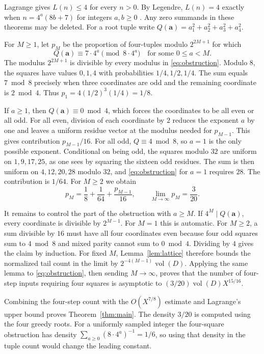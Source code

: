 \documentclass[11pt]{article}
\begin{document}
Lagrange gives \(L(n)\le4\) for every \(n>0\). By Legendre, \(L(n)=4\) exactly when \(n=4^a(8b+7)\) for integers \(a,b\ge0\) \cite{hardy}. Any zero summands in these theorems may be deleted. For a root tuple write \(Q(\mathbf a)=a_1^2+a_2^2+a_3^2+a_4^2\).

For \(M\ge1\), let \(p_M\) be the proportion of four-tuples modulo \(2^{2M+1}\) for which
\[
 Q(\mathbf a)\equiv 7\cdot4^a \pmod {8\cdot4^a}
 \quad\text{for some }0\le a<M.                             \tag{2}\label{eq:obstruction}
\]
The modulus \(2^{2M+1}\) is divisible by every modulus in \eqref{eq:obstruction}. Modulo \(8\), the squares have values \(0,1,4\) with probabilities \(1/4,1/2,1/4\). The sum equals \(7\bmod 8\) precisely when three coordinates are odd and the remaining coordinate is \(2\bmod4\). Thus \(p_1=4(1/2)^3(1/4)=1/8\).

If \(a\ge1\), then \(Q(\mathbf a)\equiv0\bmod4\), which forces the coordinates to be all even or all odd. For all even, division of each coordinate by \(2\) reduces the exponent \(a\) by one and leaves a uniform residue vector at the modulus needed for \(p_{M-1}\). This gives contribution \(p_{M-1}/16\). For all odd, \(Q\equiv4\bmod8\), so \(a=1\) is the only possible exponent. Conditional on being odd, the squares modulo \(32\) are uniform on \(1,9,17,25\), as one sees by squaring the sixteen odd residues. The sum is then uniform on \(4,12,20,28\) modulo \(32\), and \eqref{eq:obstruction} for \(a=1\) requires \(28\). The contribution is \(1/64\). For \(M\ge2\) we obtain
\[
 p_M=\frac18+\frac1{64}+\frac{p_{M-1}}{16},
 \qquad
 \lim_{M\to\infty}p_M=\frac3{20}.
\]

It remains to control the part of the obstruction with \(a\ge M\). If \(4^M\mid Q(\mathbf a)\), every coordinate is divisible by \(2^{M-1}\). For \(M=1\) this is automatic. For \(M\ge2\), a sum divisible by \(16\) must have all four coordinates even because four odd squares sum to \(4\bmod8\) and mixed parity cannot sum to \(0\bmod4\). Dividing by \(4\) gives the claim by induction. For fixed \(M\), Lemma~\ref{lem:lattice} therefore bounds the normalized tail count in the limit by \(2^{-4(M-1)}\operatorname{vol}(D)\). Applying the same lemma to \eqref{eq:obstruction}, then sending \(M\to\infty\), proves that the number of four-step inputs requiring four squares is asymptotic to \((3/20)\operatorname{vol}(D)X^{15/16}\).

Combining the four-step count with the \(O(X^{7/8})\) estimate and Lagrange's upper bound proves Theorem~\ref{thm:main}. The density \(3/20\) is computed using the four greedy roots. For a uniformly sampled integer the four-square obstruction has density \(\sum_{a\ge0}(8\cdot4^a)^{-1}=1/6\), so using that density in the tuple count would change the leading constant.
\end{document}
